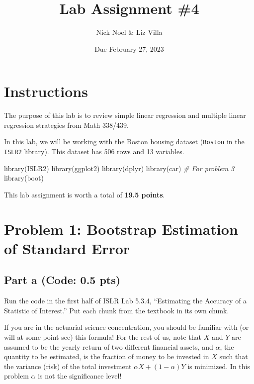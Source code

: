\documentclass[
]{article}
\title{Lab Assignment \#4}
\author{Nick Noel \& Liz Villa}
\date{Due February 27, 2023}
\newenvironment{Shaded}{\begin{snugshade}}{\end{snugshade}}
\newcommand{\CommentTok}[1]{\textcolor[rgb]{0.56,0.35,0.01}{\textit{#1}}}
\newcommand{\FunctionTok}[1]{\textcolor[rgb]{0.00,0.00,0.00}{#1}}
\newcommand{\NormalTok}[1]{#1}
\begin{document}
\maketitle

\hypertarget{instructions}{%
\section{Instructions}\label{instructions}}

The purpose of this lab is to review simple linear regression and
multiple linear regression strategies from Math 338/439.

In this lab, we will be working with the Boston housing dataset
(\texttt{Boston} in the \texttt{ISLR2} library). This dataset has 506
rows and 13 variables.

\begin{Shaded}
\begin{Highlighting}[]
\FunctionTok{library}\NormalTok{(ISLR2)}
\FunctionTok{library}\NormalTok{(ggplot2)}
\FunctionTok{library}\NormalTok{(dplyr)}
\FunctionTok{library}\NormalTok{(car) }\CommentTok{\# For problem 3}
\FunctionTok{library}\NormalTok{(boot)}
\end{Highlighting}
\end{Shaded}

This lab assignment is worth a total of \textbf{19.5 points}.

\hypertarget{problem-1-bootstrap-estimation-of-standard-error}{%
\section{Problem 1: Bootstrap Estimation of Standard
Error}\label{problem-1-bootstrap-estimation-of-standard-error}}

\hypertarget{part-a-code-0.5-pts}{%
\subsection{Part a (Code: 0.5 pts)}\label{part-a-code-0.5-pts}}

Run the code in the first half of ISLR Lab 5.3.4, ``Estimating the
Accuracy of a Statistic of Interest.'' Put each chunk from the textbook
in its own chunk.

If you are in the actuarial science concentration, you should be
familiar with (or will at some point see) this formula! For the rest of
us, note that \(X\) and \(Y\) are assumed to be the yearly return of two
different financial assets, and \(\alpha\), the quantity to be
estimated, is the fraction of money to be invested in \(X\) such that
the variance (risk) of the total investment
\(\alpha X + (1 - \alpha) Y\) is minimized. In this problem \(\alpha\)
is not the significance level!
\end{document}
